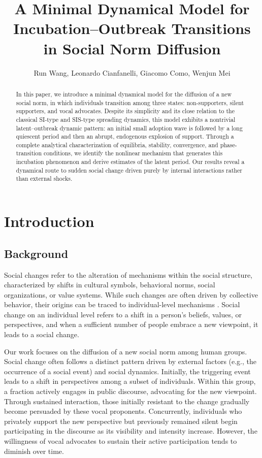 \documentclass{article}
\title{A Minimal Dynamical Model for Incubation–Outbreak Transitions in Social Norm Diffusion}
\author{Run Wang, Leonardo Cianfanelli, Giacomo Como, Wenjun Mei}
\begin{document}
\maketitle

\begin{abstract}
In this paper, we introduce a minimal dynamical model for the diffusion of a new social norm, in which individuals transition among three states: non-supporters, silent supporters, and vocal advocates. Despite its simplicity and its close relation to the classical SI-type and SIS-type spreading dynamics, this model exhibits a nontrivial latent–outbreak dynamic pattern: an initial small adoption wave is followed by a long quiescent period and then an abrupt, endogenous explosion of support. Through a complete analytical characterization of equilibria, stability, convergence, and phase-transition conditions, we identify the nonlinear mechanism that generates this incubation phenomenon and derive estimates of the latent period. Our results reveal a dynamical route to sudden social change driven purely by internal interactions rather than external shocks.
\end{abstract}

\section{Introduction}
\subsection{Background}
Social changes refer to the alteration of mechanisms within the social structure, characterized by shifts in cultural symbols, behavioral norms, social organizations, or value systems. While such changes are often driven by collective behavior, their origins can be traced to individual-level mechanisms \cite{nowak1990private}. Social change on an individual level refers to a shift in a person's beliefs, values, or perspectives, and when a sufficient number of people embrace a new viewpoint, it leads to a social change.

Our work focuses on the diffusion of a new social norm among human groups. Social change often follows a distinct pattern driven by external factors (e.g., the occurrence of a social event) and social dynamics. Initially, the triggering event leads to a shift in perspectives among a subset of individuals. Within this group, a fraction actively engages in public discourse, advocating for the new viewpoint. Through sustained interaction, those initially resistant to the change gradually become persuaded by these vocal proponents. Concurrently, individuals who privately support the new perspective but previously remained silent begin participating in the discourse as its visibility and intensity increase. However, the willingness of vocal advocates to sustain their active participation tends to diminish over time.
\end{document}
